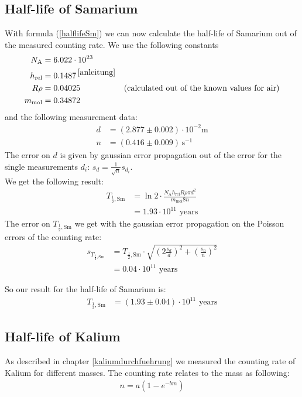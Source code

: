 \documentclass[12pt]{article}
\begin{document}
\subsection{Half-life of Samarium}
With formula (\ref{halflifeSm}) we can now calculate the half-life of Samarium out of the measured counting rate. We use the following constants
\begin{align*}
	N_{\text{A}}&=6.022\cdot10^{23}\\
	h_{\text{rel}}&=0.1487\,^{\cite{anleitung}}\\
	R\rho&=0.04025&\text{(calculated out of the known values for air)}\\
	m_{\text{mol}}&=0.34872
\end{align*}
and the following measurement data:
\begin{align*}
	d&=(2.877\pm0.002)\cdot10^{-2}\mathrm{m}\\
	n&=(0.416\pm0.009)\,\mathrm{s^{-1}}
\end{align*}
The error on $d$ is given by gaussian error propagation out of the error for the single measurements $d_i$: $s_d=\frac1{\sqrt{n}}s_{d_i}$.\\
We get the following result: 
\begin{align*}
	T_{\frac12,\text{Sm}}&=\ln2\cdot\frac{N_{\text{A}}h_{\text{rel}}R\rho\pi d^2}{m_{\text{mol}}8n}\\&=1.93\cdot 10^{11}\text{ years}
\end{align*}
The error on $T_{\frac12,\text{Sm}}$ we get with the gaussian error propagation on the Poisson errors of the counting rate: 
\begin{align*}
	s_{T_{\frac12,\text{Sm}}}&=T_{\frac12,\text{Sm}}\cdot\sqrt{\left(2\frac{s_d}{d}\right)^2+\left(\frac{s_n}{n}\right)^2}\\&=0.04\cdot 10^{11}\text{ years}
\end{align*}

So our result for the half-life of Samarium is:
\begin{align*}
	T_{\frac12,\text{Sm}}&=\left(1.93\pm0.04\right)\cdot10^{11}\text{ years}
\end{align*}
\newpage
\subsection{Half-life of Kalium}
As described in chapter \ref{kaliumdurchfuehrung} we measured the counting rate of Kalium for different masses. The counting rate relates to the mass as following: 
\begin{align}
	n=a(1-e^{-bm})\label{fitfunction}
\end{align}
\end{document}
